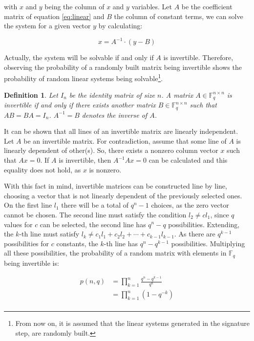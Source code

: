 \documentclass{ufsctex/ufsctex}
\newtheorem{definition}{Definition}
\begin{document}
with $x$ and $y$ being the column of $x$ and $y$ variables. Let $A$ be the
coefficient matrix of equation \ref{eq:linear} and $B$ the column of constant
terms, we can solve the system for a given vector $y$ by calculating:

\begin{equation}
x = A^{-1} \cdot (y - B)
\end{equation}

Actually, the system will be solvable if and only if $A$ is invertible.
Therefore, observing the probability of a randomly built matrix being
invertible shows the probability of random linear systems being
solvable\footnote{From now on, it is assumed that the linear systems generated
in the signature step, are randomly built.}.

\begin{definition}
Let $I_n$ be the identity matrix of size $n$. A matrix $A \in \mathbb{F}^{n
\times n}_q$ is invertible if and only if there exists another matrix $B \in
\mathbb{F}^{n \times n}_q$ such that $AB = BA = I_n$. $A^{-1} = B$ denotes the
inverse of $A$.
\end{definition}

It can be shown that all lines of an invertible matrix are linearly
independent. Let $A$ be an invertible matrix. For contradiction, assume that
some line of $A$ is linearly dependent of other(s). So, there exists a nonzero
column vector $x$ such that $Ax = 0$. If $A$ is invertible, then $A^{-1}Ax = 0$
can be calculated and this equality does not hold, as $x$ is nonzero.

With this fact in mind, invertible matrices can be constructed line by line,
choosing a vector that is not linearly dependent of the previously selected
ones. On the first line $l_1$ there will be a total of $q^n - 1$ choices, as
the zero vector cannot be chosen. The second line must satisfy the condition
$l_2 \neq c l_1$, since $q$ values for $c$ can be selected, the second line has
$q^n - q$ possibilities. Extending, the $k$-th line must satisfy $l_k \ne
c_1l_1 + c_2l_2 + \cdots + c_{k-1}l_{k-1}$. As there are $q^{k-1}$
possibilities for $c$ constants, the $k$-th line has $q^n - q^{k-1}$
possibilities. Multiplying all these possibilities, the probability of a random
matrix with elements in $\mathbb{F}_q$ being invertible is:

\begin{equation}
\begin{split}
p(n, q) &= \prod_{k=1}^{n} \frac{q^n - q^{k-1}}{q^n} \\
&= \prod_{k=1}^{n} \left( 1 - q^{-k} \right) \\
\end{split}
\end{equation}
\end{document}
